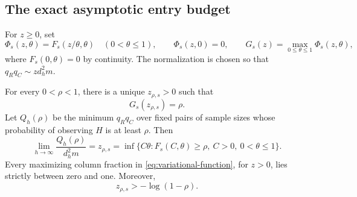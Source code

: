 \subsection{The exact asymptotic entry budget}

For \(z\ge0\), set
\begin{equation}
 \Phi_s(z,\theta)=F_s(z/\theta,\theta)\quad(0<\theta\le1),
 \qquad \Phi_s(z,0)=0,\qquad
 G_s(z)=\max_{0\le\theta\le1}\Phi_s(z,\theta),
 \label{eq:variational-function}
\end{equation}
where \(F_s(0,\theta)=0\) by continuity. The normalization is chosen
so that \(q_Rq_C\sim z d_h^2m\).

\begin{theorem}
\label{thm:optimal-rectangle}
For every \(0<\rho<1\), there is a unique \(z_{\rho,s}>0\) such that
\begin{equation}
 G_s(z_{\rho,s})=\rho.
 \label{eq:optimal-constant}
\end{equation}
Let \(Q_h(\rho)\) be the minimum \(q_Rq_C\) over fixed pairs of
sample sizes whose probability of observing \(H\) is at least \(\rho\).
Then
\begin{equation}
 \lim_{h\to\infty}\frac{Q_h(\rho)}{d_h^2m}=z_{\rho,s}
 =\inf\{C\theta:F_s(C,\theta)\ge\rho,\ C>0,\ 0<\theta\le1\}.
 \label{eq:optimal-rectangle}
\end{equation}
Every maximizing column fraction in \eqref{eq:variational-function},
for \(z>0\), lies strictly between zero and one. Moreover,
\begin{equation}
 z_{\rho,s}>-\log(1-\rho).
 \label{eq:rectangle-lower-constant}
\end{equation}
\end{theorem}
